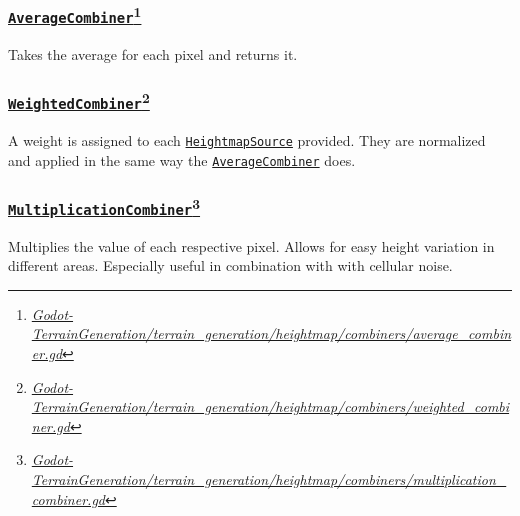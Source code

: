 \subsubsection[\texttt{AverageCombiner}]{\href{https://github.com/fsande/TFG---Eric-Rios/blob/main/Godot-TerrainGeneration/terrain_generation/heightmap/combiners/average_combiner.gd}{\texttt{AverageCombiner}}\footnote{\href{https://github.com/fsande/TFG---Eric-Rios/blob/main/Godot-TerrainGeneration/terrain_generation/heightmap/combiners/average_combiner.gd}{\textit{Godot-TerrainGeneration/terrain\_generation/heightmap/combiners/average\_combiner.gd}}}}

Takes the average for each pixel and returns it.

\subsubsection[\texttt{WeightedCombiner}]{\href{https://github.com/fsande/TFG---Eric-Rios/blob/main/Godot-TerrainGeneration/terrain_generation/heightmap/combiners/weighted_combiner.gd}{\texttt{WeightedCombiner}}\footnote{\href{https://github.com/fsande/TFG---Eric-Rios/blob/main/Godot-TerrainGeneration/terrain_generation/heightmap/combiners/weighted_combiner.gd}{\textit{Godot-TerrainGeneration/terrain\_generation/heightmap/combiners/weighted\_combiner.gd}}}}

A weight is assigned to each \href{{https://github.com/fsande/TFG---Eric-Rios/blob/main/Godot-TerrainGeneration/terrain_generation/heightmap/sources/heightmap_source.gd}}{\texttt{HeightmapSource}} provided.
They are normalized and applied in the same way the \href{https://github.com/fsande/TFG---Eric-Rios/blob/main/Godot-TerrainGeneration/terrain_generation/heightmap/combiners/average_combiner.gd}{\texttt{AverageCombiner}} does.

\subsubsection[\texttt{MultiplicationCombiner}]{\href{https://github.com/fsande/TFG---Eric-Rios/blob/main/Godot-TerrainGeneration/terrain_generation/heightmap/combiners/multiplication_combiner.gd}{\texttt{MultiplicationCombiner}}\footnote{\href{https://github.com/fsande/TFG---Eric-Rios/blob/main/Godot-TerrainGeneration/terrain_generation/heightmap/combiners/multiplication_combiner.gd}{\textit{Godot-TerrainGeneration/terrain\_generation/heightmap/combiners/multiplication\_combiner.gd}}}}

Multiplies the value of each respective pixel.
Allows for easy height variation in different areas.
Especially useful in combination with with cellular noise.

